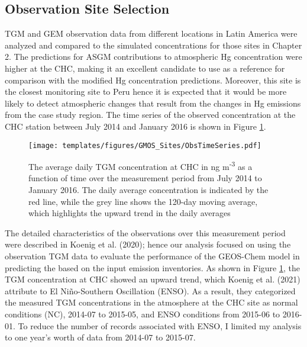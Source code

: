 
\subsection{Observation Site Selection}

\begin{flushleft}
TGM and GEM observation data from different locations in Latin America were analyzed and compared to the \gc simulated \hg concentrations for those sites in Chapter 2. The \gc predictions for ASGM contributions to atmospheric Hg concentration were higher at the CHC, making it an excellent candidate to use as a reference for comparison with the modified \gc Hg concentration predictions. Moreover, this site is the closest monitoring site to Peru hence it is expected that it would be more likely to detect atmospheric \hg changes that result from the changes in Hg emissions from the case study region. The time series of the observed concentration at the CHC station between July 2014 and January 2016 is shown in Figure \ref{fig:chc_time_series}.
\end{flushleft}

\begin{figure}[H]
  \texttt{[image: templates/figures/GMOS\_Sites/ObsTimeSeries.pdf]}
 
  \caption{The average daily TGM concentration at CHC in ng m\textsuperscript{-3} as a function of time over the measurement period from July 2014 to January 2016. The daily average concentration is indicated by the red line, while the grey line shows the 120-day moving average, which highlights the upward trend in the daily averages}
  \label{fig:chc_time_series}
  \centering
\end{figure}
\FloatBarrier
\begin{flushleft}

The detailed characteristics of the observations over this measurement period were described in Koenig et al. (2020); hence our analysis focused on using the observation TGM data to evaluate the performance of the GEOS-Chem model in predicting the \hg based on the input \hg emission inventories. As shown in Figure \ref{fig:chc_time_series}, the TGM concentration at CHC showed an upward trend, which Koenig et al. (2021) attribute to El Ni\~no-Southern Oscillation (ENSO)\cite{koenig_seasonal_2021}. As a result, they categorized the measured TGM concentrations in the atmosphere at the CHC site as normal conditions (NC), 2014-07 to 2015-05, and ENSO conditions from 2015-06 to 2016-01. To reduce the number of records associated with ENSO, I limited my analysis to one year's worth of data from 2014-07 to 2015-07.
\end{flushleft}

